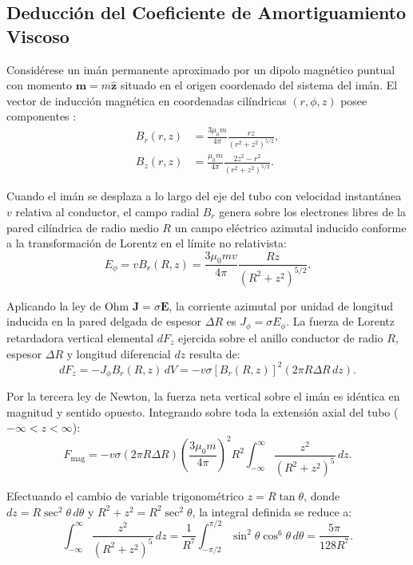 \documentclass[aps,prb,reprint,twocolumn,superscriptaddress,amsmath,amssymb,floatfix]{revtex4-2}
\begin{document}
\subsection{Deducción del Coeficiente de Amortiguamiento Viscoso}
Considérese un imán permanente aproximado por un dipolo magnético puntual con momento $\mathbf{m} = m\hat{\mathbf{z}}$ situado en el origen coordenado del sistema del imán. El vector de inducción magnética en coordenadas cilíndricas $(r, \phi, z)$ posee componentes \cite{Griffiths2017,Jackson1999}:
\begin{align}
B_r(r, z) &= \frac{3\mu_0 m}{4\pi} \frac{r z}{(r^2 + z^2)^{5/2}}, \label{eq:br} \\
B_z(r, z) &= \frac{\mu_0 m}{4\pi} \frac{2z^2 - r^2}{(r^2 + z^2)^{5/2}}. \label{eq:bz}
\end{align}

Cuando el imán se desplaza a lo largo del eje del tubo con velocidad instantánea $v$ relativa al conductor, el campo radial $B_r$ genera sobre los electrones libres de la pared cilíndrica de radio medio $R$ un campo eléctrico azimutal inducido conforme a la transformación de Lorentz en el límite no relativista:
\begin{equation}
E_\phi = v B_r(R, z) = \frac{3\mu_0 m v}{4\pi} \frac{R z}{(R^2 + z^2)^{5/2}}.
\label{eq:ephi}
\end{equation}

Aplicando la ley de Ohm $\mathbf{J} = \sigma \mathbf{E}$, la corriente azimutal por unidad de longitud inducida en la pared delgada de espesor $\Delta R$ es $J_\phi = \sigma E_\phi$. La fuerza de Lorentz retardadora vertical elemental $dF_z$ ejercida sobre el anillo conductor de radio $R$, espesor $\Delta R$ y longitud diferencial $dz$ resulta de:
\begin{equation}
dF_z = -J_\phi B_r(R, z)\, dV = -v \sigma \left[ B_r(R, z) \right]^2 (2\pi R \Delta R\, dz).
\label{eq:dfz}
\end{equation}

Por la tercera ley de Newton, la fuerza neta vertical sobre el imán es idéntica en magnitud y sentido opuesto. Integrando sobre toda la extensión axial del tubo ($-\infty < z < \infty$):
\begin{equation}
F_{\mathrm{mag}} = -v \sigma (2\pi R \Delta R) \left( \frac{3\mu_0 m}{4\pi} \right)^2 R^2 \int_{-\infty}^{\infty} \frac{z^2}{(R^2 + z^2)^5}\, dz.
\label{eq:integral_fuerza}
\end{equation}

Efectuando el cambio de variable trigonométrico $z = R\tan\theta$, donde $dz = R\sec^2\theta\, d\theta$ y $R^2 + z^2 = R^2\sec^2\theta$, la integral definida se reduce a:
\begin{equation}
\int_{-\infty}^{\infty} \frac{z^2}{(R^2 + z^2)^5}\, dz = \frac{1}{R^7} \int_{-\pi/2}^{\pi/2} \sin^2\theta \cos^6\theta\, d\theta = \frac{5\pi}{128 R^7}.
\label{eq:integral_resuelta}
\end{equation}
\end{document}
